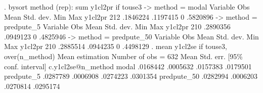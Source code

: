 . bysort method (rep): sum y1cl2pr if touse3
{\smallskip}
-> method = modal
{\smallskip}
    Variable {\VBAR}        Obs        Mean    Std. dev.       Min        Max
     y1cl2pr {\VBAR}        212    .1846224    .1197415          0   .5820896
{\smallskip}
-> method = predpute_5
{\smallskip}
    Variable {\VBAR}        Obs        Mean    Std. dev.       Min        Max
     y1cl2pr {\VBAR}        210    .2890356    .0949123          0   .4825946
{\smallskip}
-> method = predpute_50
{\smallskip}
    Variable {\VBAR}        Obs        Mean    Std. dev.       Min        Max
     y1cl2pr {\VBAR}        210    .2885514    .0944235          0   .4498129
{\smallskip}
{\smallskip}
. mean y1cl2se if touse3, over(n_method)
{\smallskip}
Mean estimation                                  Number of obs = 632
{\smallskip}
                   {\VBAR}       Mean   Std. err.     [95\% conf. interval]
c.y1cl2se@n_method {\VBAR}
            modal  {\VBAR}   .0168442   .0005632      .0157383    .0179501
       predpute_5  {\VBAR}   .0287789   .0006908      .0274223    .0301354
      predpute_50  {\VBAR}   .0282994   .0006203      .0270814    .0295174
